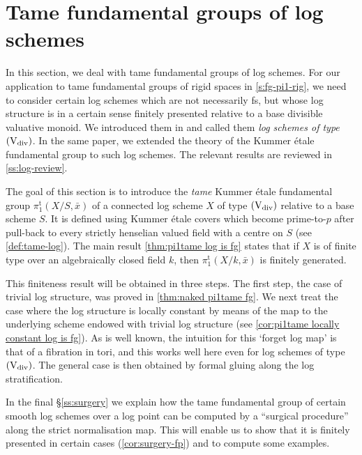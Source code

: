 \documentclass[a4paper,twoside,11pt,reqno]{amsart}
\newcommand{\typeVd}{(\mathrm{V}_{\rm div})}
\newcommand{\pitame}{\pi_1^{\mathrm{t}}}
\theoremstyle{definition}
\numberwithin{equation}{subsection}
\begin{document}
\section{Tame fundamental groups of log schemes}
\label{s:fg-pi1-log}
In this section, we deal with tame fundamental groups of log schemes. For our application to tame fundamental groups of rigid spaces in \cref{s:fg-pi1-rig}, we need to consider certain log schemes which are not necessarily fs, but whose log structure is in a certain sense finitely presented relative to a base divisible valuative monoid. We introduced them in \cite{AHLS-Log} and called them \emph{log schemes of type $\typeVd$}. In the same paper, we extended the theory of the Kummer \'etale fundamental group to such log schemes. The relevant results are reviewed in \cref{ss:log-review}. 

The goal of this section is to introduce the \emph{tame} Kummer \'etale fundamental group $\pitame(X/S, \bar x)$ of a connected log scheme $X$ of type $\typeVd$ relative to a base scheme $S$. It is defined using Kummer \'etale covers which become prime-to-$p$ after pull-back to every strictly henselian valued field with a centre on $S$ (see \cref{def:tame-log}). The main result \cref{thm:pi1tame log is fg} states that if $X$ is of finite type over an algebraically closed field $k$, then $\pitame(X/k, \bar x)$ is finitely generated.

This finiteness result will be obtained in three steps. The first step, the case of trivial log structure, was proved in \cref{thm:naked pi1tame fg}. We next treat the case where the log structure is locally constant by means of the map to the underlying scheme endowed with trivial log structure (see \cref{cor:pi1tame locally constant log is fg}). As is well known, the intuition for this `forget log map' is that of a fibration in tori, and this works well here even for log schemes of type $\typeVd$. The general case is then obtained by formal gluing along the log stratification.

In the final \S\ref{ss:surgery} we explain how the tame fundamental group of certain smooth log schemes over a log point can be computed by a ``surgical procedure'' along the strict normalisation map. This will enable us to show that it is finitely presented in certain cases (\cref{cor:surgery-fp}) and to compute some examples.

\end{document}
